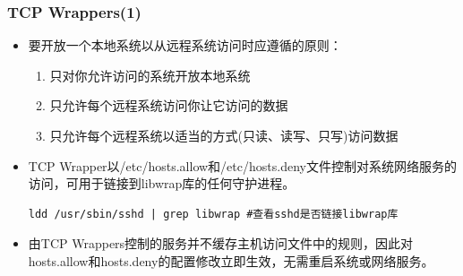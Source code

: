 \documentclass[xcolor=svgnames,presentation]{beamer}
\begin{document}
\begin{frame}[fragile]
\frametitle{TCP Wrappers(1)}
\label{sec-7-3}
\begin{itemize}

\item 要开放一个本地系统以从远程系统访问时应遵循的原则：
\label{sec-7-3-1}%
\begin{enumerate}
\item 只对你允许访问的系统开放本地系统
\item 只允许每个远程系统访问你让它访问的数据
\item 只允许每个远程系统以适当的方式(只读、读写、只写)访问数据
\end{enumerate}

\item TCP Wrapper以/etc/hosts.allow和/etc/hosts.deny文件控制对系统网络服务的访问，可用于链接到libwrap库的任何守护进程。\\
\label{sec-7-3-2}%
\begin{verbatim}
ldd /usr/sbin/sshd | grep libwrap #查看sshd是否链接libwrap库
\end{verbatim}

\item 由TCP Wrappers控制的服务并不缓存主机访问文件中的规则，因此对hosts.allow和hosts.deny的配置修改立即生效，无需重启系统或网络服务。
\label{sec-7-3-3}%
\end{itemize} %
\end{frame}
\end{document}
